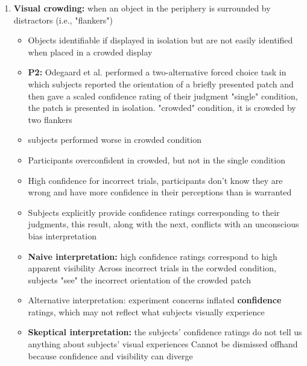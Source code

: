 \documentclass{article}
\begin{document}
\begin{enumerate}
    \item \textbf{Visual crowding:} when an object in the periphery is surrounded by distractors (i.e., "flankers") 
        \begin{itemize}
            \item Objects identifiable if displayed in isolation but are not easily identified when placed in a crowded display
            \item \textbf{P2:} Odegaard et al. performed a two-alternative forced choice task in which subjects reported the orientation of a briefly presented patch and then gave a scaled confidence rating of their judgment 
            \subitem "single" condition, the patch is presented in isolation. 
            \subitem "crowded" condition, it is crowded by two flankers
            \item subjects performed worse in crowded condition
            \item Participants overconfident in crowded, but not in the single condition 
            \item High confidence for incorrect trials, participants don't know they are wrong and have more confidence in their perceptions than is warranted
            \item Subjects explicitly provide confidence ratings corresponding to their judgments, this result, along with the next, conflicts with an unconscious bias interpretation
            \item \textbf{Naive interpretation:} high confidence ratings correspond to high apparent visibility 
                \subitem Across incorrect trials in the corwded condition, subjects "see" the incorrect orientation of the crowded patch
            \item Alternative interpretation: experiment concerns inflated \textbf{confidence} ratings, which may not reflect what subjects visually experience
            \item \textbf{Skeptical interpretation:} the subjects' confidence ratings do not tell us anything about subjects' visual experiences
                \subitem Cannot be dismissed offhand because confidence and visibility can diverge
        \end{itemize}
    

\end{enumerate}
\end{document}
